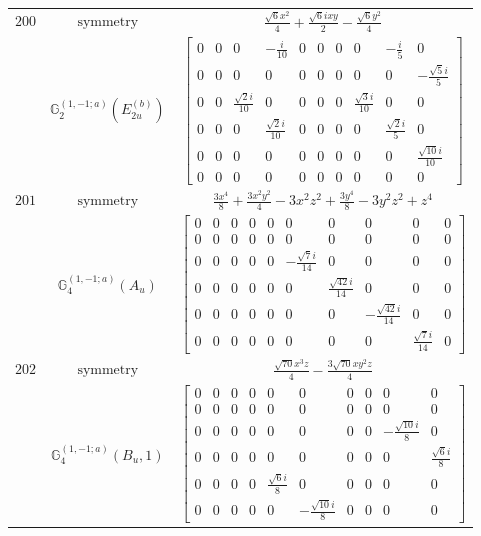 \documentclass[fleqn,8pt,landscape]{jsarticle}
\begin{document}
\begin{longtable}{ccc}
$ 200 $ & $ \text{symmetry} $ & $ \frac{\sqrt{6} x^{2}}{4} + \frac{\sqrt{6} i x y}{2} - \frac{\sqrt{6} y^{2}}{4} $ \\
$  $ & $ \mathbb{G}_{2}^{(1,-1;a)}(E_{2u}^{(b)}) $ & $ \begin{bmatrix} 0 & 0 & 0 & - \frac{i}{10} & 0 & 0 & 0 & 0 & - \frac{i}{5} & 0 \\ 0 & 0 & 0 & 0 & 0 & 0 & 0 & 0 & 0 & - \frac{\sqrt{5} i}{5} \\ 0 & 0 & \frac{\sqrt{2} i}{10} & 0 & 0 & 0 & 0 & \frac{\sqrt{3} i}{10} & 0 & 0 \\ 0 & 0 & 0 & \frac{\sqrt{2} i}{10} & 0 & 0 & 0 & 0 & \frac{\sqrt{2} i}{5} & 0 \\ 0 & 0 & 0 & 0 & 0 & 0 & 0 & 0 & 0 & \frac{\sqrt{10} i}{10} \\ 0 & 0 & 0 & 0 & 0 & 0 & 0 & 0 & 0 & 0 \end{bmatrix} $ \\ \hline
$ 201 $ & $ \text{symmetry} $ & $ \frac{3 x^{4}}{8} + \frac{3 x^{2} y^{2}}{4} - 3 x^{2} z^{2} + \frac{3 y^{4}}{8} - 3 y^{2} z^{2} + z^{4} $ \\
$  $ & $ \mathbb{G}_{4}^{(1,-1;a)}(A_{u}) $ & $ \begin{bmatrix} 0 & 0 & 0 & 0 & 0 & 0 & 0 & 0 & 0 & 0 \\ 0 & 0 & 0 & 0 & 0 & 0 & 0 & 0 & 0 & 0 \\ 0 & 0 & 0 & 0 & 0 & - \frac{\sqrt{7} i}{14} & 0 & 0 & 0 & 0 \\ 0 & 0 & 0 & 0 & 0 & 0 & \frac{\sqrt{42} i}{14} & 0 & 0 & 0 \\ 0 & 0 & 0 & 0 & 0 & 0 & 0 & - \frac{\sqrt{42} i}{14} & 0 & 0 \\ 0 & 0 & 0 & 0 & 0 & 0 & 0 & 0 & \frac{\sqrt{7} i}{14} & 0 \end{bmatrix} $ \\ \hline
$ 202 $ & $ \text{symmetry} $ & $ \frac{\sqrt{70} x^{3} z}{4} - \frac{3 \sqrt{70} x y^{2} z}{4} $ \\
$  $ & $ \mathbb{G}_{4}^{(1,-1;a)}(B_{u},1) $ & $ \begin{bmatrix} 0 & 0 & 0 & 0 & 0 & 0 & 0 & 0 & 0 & 0 \\ 0 & 0 & 0 & 0 & 0 & 0 & 0 & 0 & 0 & 0 \\ 0 & 0 & 0 & 0 & 0 & 0 & 0 & 0 & - \frac{\sqrt{10} i}{8} & 0 \\ 0 & 0 & 0 & 0 & 0 & 0 & 0 & 0 & 0 & \frac{\sqrt{6} i}{8} \\ 0 & 0 & 0 & 0 & \frac{\sqrt{6} i}{8} & 0 & 0 & 0 & 0 & 0 \\ 0 & 0 & 0 & 0 & 0 & - \frac{\sqrt{10} i}{8} & 0 & 0 & 0 & 0 \end{bmatrix} $ \\ \hline

\end{longtable}
\end{document}
